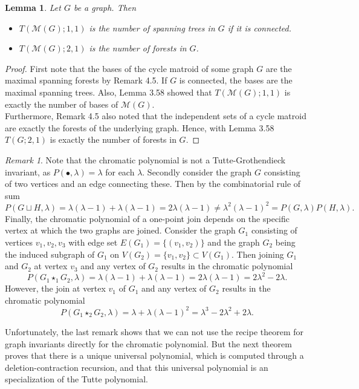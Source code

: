 \documentclass[12pt,a4paper, twoside, autooneside=false]{scrartcl}
\newtheorem{lemma}[theorem]{Lemma}
\theoremstyle{definition}
\theoremstyle{remark}
\newtheorem{remark}[theorem]{Remark}
\numberwithin{equation}{section}
\newcommand{\M}{\mathcal{M}} %
\begin{document}
\begin{lemma}Let $G$ be a graph. Then
\begin{itemize}
\item[a)]$T(\M(G);1,1)$ is the number of spanning trees in $G$ if it is connected.
\item[b)]$T(\M(G);2,1)$ is the number of forests in $G$.
\end{itemize}
\end{lemma}
\begin{proof}
First note that the bases of the cycle matroid of some graph $G$ are the maximal spanning forests by Remark 4.5. If $G$ is connected, the bases are the maximal spanning trees. Also, Lemma 3.58 showed that $T(\M(G);1,1)$ is exactly the number of bases of $\M(G)$. \\
\indent Furthermore, Remark 4.5 also noted that the independent sets of a cycle matroid are exactly the forests of the underlying graph. Hence, with Lemma 3.58 $T(G;2,1)$ is exactly the number of forests in $G$.
\end{proof}
\begin{remark}
Note that the chromatic polynomial is not a Tutte-Grothendieck invariant, as $P(\bullet,\lambda) = \lambda$ for each $\lambda$. Secondly consider the graph $G$ consisting of two vertices and an edge connecting these. Then by the combinatorial rule of sum
\[
P(G \sqcup H, \lambda) = \lambda( \lambda - 1) + \lambda(\lambda - 1) = 2 \lambda(\lambda - 1) \neq \lambda^2(\lambda - 1)^2 = P(G, \lambda)P(H, \lambda).
\]
Finally, the chromatic polynomial of a one-point join depends on the specific vertex at which the two graphs are joined. Consider the graph $G_1$ consisting of vertices $v_1, v_2, v_3$ with edge set $E(G_1) = \{(v_1,v_2)\}$ and the graph $G_2$ being the induced subgraph of $G_1$ on $V(G_2) = \{v_1, v_2\} \subset V(G_1)$. Then joining $G_1$ and $G_2$ at vertex $v_3$ and any vertex of $G_2$ results in the chromatic polynomial 
\[
P(G_1 \star_1 G_2, \lambda) = \lambda(\lambda - 1) + \lambda(\lambda - 1) = 2\lambda (\lambda - 1)= 2 \lambda^2 - 2\lambda.
\]
However, the join at vertex $v_1$ of $G_1$ and any vertex of $G_2$ results in the chromatic polynomial
\[
P(G_1 \star_2 G_2, \lambda) = \lambda + \lambda(\lambda - 1)^2 = \lambda ^3 -2\lambda^2 + 2\lambda.
\]
\end{remark}
Unfortunately, the last remark shows that we can not use the recipe theorem for graph invariants directly for the chromatic polynomial. But the next theorem proves that there is a unique universal polynomial, which is computed through a deletion-contraction recursion, and that this universal polynomial is an specialization of the Tutte polynomial. 
\end{document}

